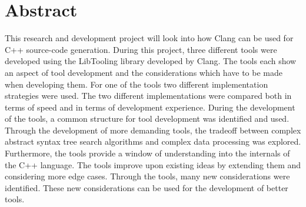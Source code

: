 \section*{Abstract}

This research and development project will look into how Clang can be used for C++ source-code generation. 
During this project, three different tools were developed using the LibTooling library developed by Clang.
The tools each show an aspect of tool development and the considerations which have to be made when developing them.
For one of the tools two different implementation strategies were used.
The two different implementations were compared both in terms of speed and in terms of development experience.
During the development of the tools, a common structure for tool development was identified and used. 
Through the development of more demanding tools, the tradeoff between complex abstract syntax tree search algorithms and complex data processing was explored.
Furthermore, the tools provide a window of understanding into the internals of the C++ language.
The tools improve upon existing ideas by extending them and considering more edge cases.
Through the tools, many new considerations were identified.
These new considerations can be used for the development of better tools. 